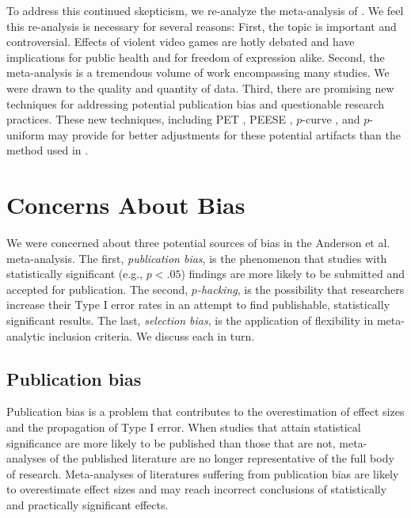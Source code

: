 \documentclass[man, mask]{apa6}
\begin{document}
To address this continued skepticism, we re-analyze the meta-analysis of \citet{Anderson:etal:2010}. We feel this re-analysis is necessary for several reasons:  First, the topic is important and controversial. Effects of violent video games are hotly debated and have implications for public health and for freedom of expression alike. Second, the \citet{Anderson:etal:2010} meta-analysis is a tremendous volume of work encompassing many studies. We were drawn to the quality and quantity of data. Third, there are promising new techniques for addressing potential publication bias and questionable research practices.  These new techniques, including PET \citep[Precision-Effect Test,][]{Stanley:Doucouliagos:2014}, PEESE \citep[Precision-Effect Estimate with Standard Error,][]{Stanley:Doucouliagos:2014}, $p$-curve \citep{Simonsohn:etal:2014,Simonsohn:etal:2014b}, and $p$-uniform \citet{van Assen:etal:2015} may provide for better adjustments for these potential artifacts than the method used in \citet{Anderson:etal:2010}. 

\section{Concerns About Bias}
We were concerned about three potential sources of bias in the Anderson et al. meta-analysis. The first, {\em publication bias}, is the phenomenon that studies with statistically significant (e.g., $p<.05$) findings are more likely to be submitted and accepted for publication. The second, {\em $p$-hacking}, is the possibility that researchers increase their Type I error rates in an attempt to find publishable, statistically significant results. The last, {\em selection bias}, is the application of flexibility in meta-analytic inclusion criteria. We discuss each in turn.

\subsection{Publication bias}
Publication bias is a problem that contributes to the overestimation of effect sizes and the propagation of Type I error. When studies that attain statistical significance are more likely to be published than those that are not, meta-analyses of the published literature are no longer representative of the full body of research. Meta-analyses of literatures suffering from publication bias are likely to overestimate effect sizes and may reach incorrect conclusions of statistically and practically significant effects.
\end{document}
